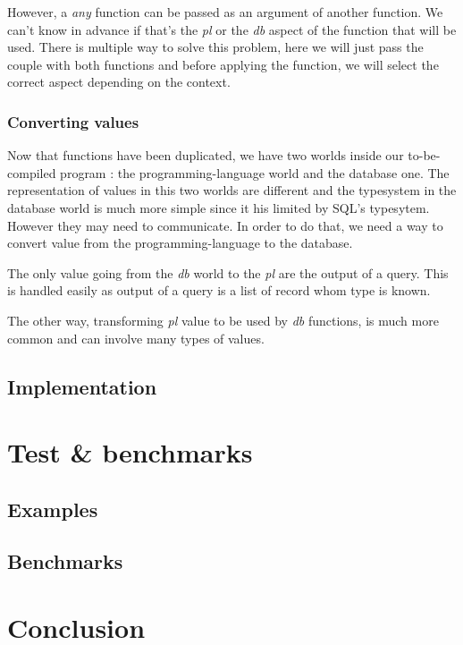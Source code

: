 \documentclass[11pt]{article}
\newcommand\effect[1]{{\em #1}}
\begin{document}
However, a \effect{any} function can be passed as an argument of another function. We can't know in advance if that's the \effect{pl} or the \effect{db} aspect of the function that will be used. There is multiple way to solve this problem, here we will just pass the couple with both functions and before applying the function, we will select the correct aspect depending on the context.

\subsubsection{Converting values}

Now that functions have been duplicated, we have two worlds inside our to-be-compiled program : the programming-language world and the database one. The representation of values in this two worlds are different and the typesystem in the database world is much more simple since it his limited by SQL's typesytem. However they may need to communicate. In order to do that, we need a way to convert value from the programming-language to the database. 

The only value going from the \effect{db} world to the \effect{pl} are the output of a query. This is handled easily as output of a query is a list of record whom type is known.

The other way, transforming \effect{pl} value to be used by \effect{db} functions, is much more common and can involve many types of values.

\subsection{Implementation}


\section{Test \& benchmarks}

\subsection{Examples}

\subsection{Benchmarks}

\section{Conclusion}
\end{document}
